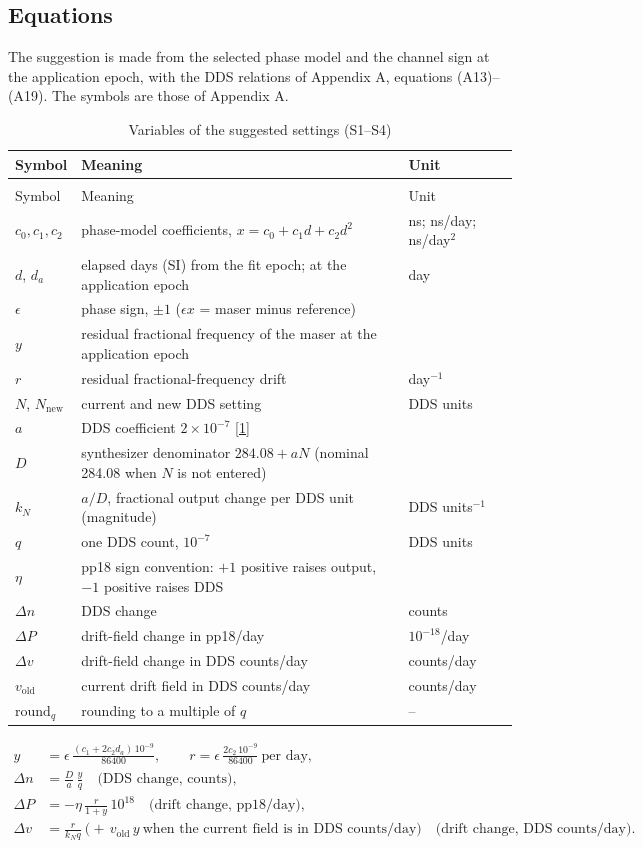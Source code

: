 \documentclass[11pt,a4paper]{article}
\makeatletter
\newcommand{\manual}{\href{https://www.gb.nrao.edu/~fghigo/timer/MSMmaser/Maser_UG_75666-201_Rev_J.PDF}{[1]}}
\renewcommand{\_}{\usscore\allowbreak}
\newenvironment{vartable}[2]{%
 \par\small\setlength{\LTpre}{3pt}\setlength{\LTpost}{3pt}%
 \begin{longtable}{@{}>{\raggedright}p{.2\linewidth}>{\raggedright}p{.57\linewidth}>{\raggedright\arraybackslash}p{.17\linewidth}@{}}
 \caption{#2}\label{#1}\\
 \toprule Symbol & Meaning & Unit\\\midrule
 \endfirsthead
 \multicolumn{3}{@{}l}{\footnotesize\itshape Table \thetable{} (continued)}\\
 \toprule Symbol & Meaning & Unit\\\midrule
 \endhead
 \bottomrule
 \endlastfoot}
 {\end{longtable}\normalsize}
\makeatother
\begin{document}
\subsection{Equations}
The suggestion is made from the selected phase model and the channel sign at the application
epoch, with the DDS relations of Appendix A, equations (A13)--(A19). The symbols are those of
Appendix A.
\begin{vartable}{tab:var-S}{Variables of the suggested settings (S1--S4)}
\(c_0,c_1,c_2\) & phase-model coefficients, \(x=c_0+c_1d+c_2d^2\) & ns; ns/day; ns/day\(^2\)\\
\(d\), \(d_a\) & elapsed days (SI) from the fit epoch; at the application epoch & day\\
\(\epsilon\) & phase sign, \(\pm1\) (\(\epsilon x\) = maser minus reference) & 1\\
\(y\) & residual fractional frequency of the maser at the application epoch & 1\\
\(r\) & residual fractional-frequency drift & day\(^{-1}\)\\
\(N\), \(N_{\mathrm{new}}\) & current and new DDS setting & DDS units\\
\(a\) & DDS coefficient \(2\times10^{-7}\) \manual & 1\\
\(D\) & synthesizer denominator \(284.08+aN\) (nominal 284.08 when \(N\) is not entered) & 1\\
\(k_N\) & \(a/D\), fractional output change per DDS unit (magnitude) & DDS units\(^{-1}\)\\
\(q\) & one DDS count, \(10^{-7}\) & DDS units\\
\(\eta\) & pp18 sign convention: \(+1\) positive raises output, \(-1\) positive raises DDS & 1\\
\(\Delta n\) & DDS change & counts\\
\(\Delta P\) & drift-field change in pp18/day & \(10^{-18}\)/day\\
\(\Delta v\) & drift-field change in DDS counts/day & counts/day\\
\(v_{\mathrm{old}}\) & current drift field in DDS counts/day & counts/day\\
\(\mathrm{round}_q\) & rounding to a multiple of \(q\) & --\\
\end{vartable}
\begin{align}
y&=\epsilon\,\frac{(c_1+2c_2d_a)\,10^{-9}}{86400},\qquad
r=\epsilon\,\frac{2c_2\,10^{-9}}{86400}\ \text{per day}, \tag{S1}\label{eq:S1}\\
\Delta n&=\frac{D}{a}\,\frac{y}{q}\quad\text{(DDS change, counts)},\tag{S2}\label{eq:S2}\\
\Delta P&=-\eta\,\frac{r}{1+y}\,10^{18}\quad\text{(drift change, pp18/day)},\tag{S3}\label{eq:S3}\\
\Delta v&=\frac{r}{k_N q}\ \bigl(+\,v_{\mathrm{old}}\,y\ \text{when the current field is in DDS counts/day}\bigr)
\quad\text{(drift change, DDS counts/day)}.\tag{S4}\label{eq:S4}
\end{align}
\end{document}
